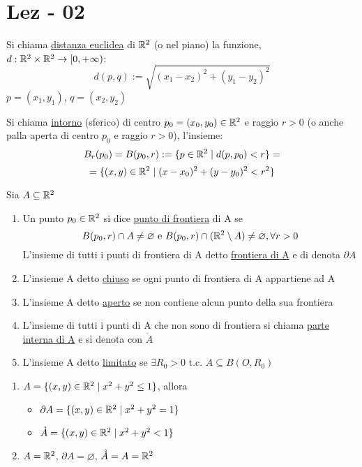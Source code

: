 \section{Lez - 02}
\begin{definition}
  Si chiama \underline{distanza euclidea} di $\mathbb{R}^2$ (o nel piano) la funzione, 
  $d: \mathbb{R}^2 \times \mathbb{R}^2 \to [0,+\infty)$:
  $$d(p,q) := \sqrt{(x_1-x_2)^2 + (y_1-y_2)^2}$$
  $p=(x_1,y_1)$, $q=(x_2,y_2)$
\end{definition}
\begin{definition}
  Si chiama \underline{intorno} (sferico) di centro $p_0 = (x_0,y_0) \in \mathbb{R}^2$ e raggio $r>0$ (o anche
  palla aperta di centro $p_0$ e raggio $r>0$), l'insieme: 
  $$B_r(p_0) = B(p_0, r) :=  \{p \in \mathbb{R}^2 \mid d(p,p_0) < r\} = $$
    $$= \{(x,y)\in \mathbb{R}^2 \mid (x-x_0)^2 + (y-y_0)^2 < r^2\}$$ 
\end{definition}
\begin{definition}
  Sia $A \subseteq \mathbb{R}^2$
  \begin{enumerate}
    \item Un punto $p_0 \in \mathbb{R}^2$ si dice \underline{punto di frontiera} di A se 
    $$B(p_0,r)\cap A \not = \varnothing \text{ e } B(p_0,r) \cap (\mathbb{R}^2 \setminus A) \not = \varnothing, \forall r > 0$$
    L'insieme di tutti i punti di frontiera di A \ace detto \underline{frontiera di A} e di denota $\partial A$
    \item L'insieme A \ace detto \underline{chiuso} se ogni punto di frontiera di A appartiene ad A
    \item L'insieme A \ace detto \underline{aperto} se non contiene alcun punto della sua frontiera
    \item L'insieme di tutti i punti di A che non sono di frontiera si chiama \underline{parte interna di A} e si denota con 
          $\mathring{A}$
    \item L'insieme A \ace detto \underline{limitato} se $\exists R_0 > 0 $ t.c. $A \subseteq B(O, R_0)$
  \end{enumerate}
\end{definition}
\begin{example}
  \begin{enumerate}
    \item $A =\{(x,y)\in \mathbb{R}^2 \mid x^2 + y^2 \leq 1\}$, allora
          \begin{itemize}
            \item $\partial A = \{(x,y)\in \mathbb{R}^2 \mid x^2 + y^2 = 1\}$
            \item $\mathring{A} = \{(x,y)\in \mathbb{R}^2 \mid x^2 + y^2 < 1\}$
          \end{itemize}
    \item $A = \mathbb{R}^2$, $\partial A = \varnothing$, $\mathring{A} = A = \mathbb{R}^2$
  \end{enumerate}
\end{example}
